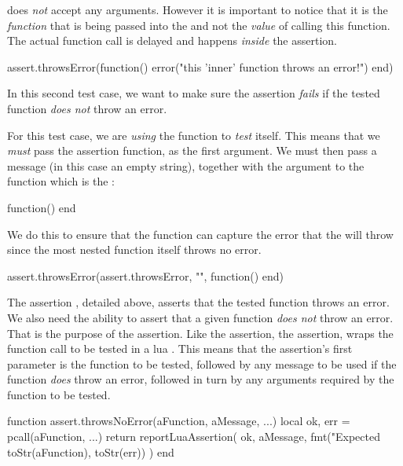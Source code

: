 \noindent does \emph{not} accept any arguments. However it is important to 
notice that it is the \emph{function} that is being passed into the 
 and not the \emph{value} of calling this 
function. The actual function call is delayed and happens \emph{inside} 
the assertion. 

\startLuaTest
  assert.throwsError(function()
    error("this 'inner' function throws an error!")
  end)
\stopLuaTest
\stopTestCase


In this second test case, we want to make sure the assertion \emph{fails} 
if the tested function \emph{does not} throw an error.

For this test case, we are \emph{using} the  
function to \emph{test} itself. This means that we \emph{must} pass the 
assertion function,  as the first argument. We 
must then pass a message (in this case an empty string), together with the 
argument to the   function which is 
the : 

\starttyping[option=lua]
function() end
\stoptyping

\noindent We do this to ensure that the  
 function can capture the error that the 
  will throw since the most 
 nested function itself throws no error. 

\startLuaTest
  assert.throwsError(assert.throwsError, "", function() end)
\stopLuaTest
\stopTestCase

\stopTestSuite



The assertion , detailed above, asserts that the 
tested function throws an error. We also need the ability to assert that a 
given function \emph{does not} throw an error. That is the purpose of the 
 assertion. Like the  
assertion, the  assertion, wraps the function 
call to be tested in a lua . This means that the 
 assertion's first parameter is the function to 
be tested, followed by any message to be used if the function \emph{does} 
throw an error, followed in turn by any arguments required by the function 
to be tested. 

\startLuaCode
function assert.throwsNoError(aFunction, aMessage, ...)
  local ok, err = pcall(aFunction, ...)
  return reportLuaAssertion(
    ok,
    aMessage,
    fmt("Expected %
      toStr(aFunction), toStr(err))
  )
end
\stopLuaCode

